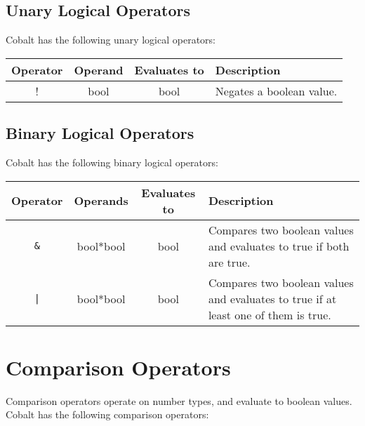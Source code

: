\documentclass[a4paper,appendixprefix]{scrreprt}
\begin{document}
\subsection{Unary Logical Operators}
Cobalt has the following unary logical operators:

\begin{center}
  \begin{tabularx}{\textwidth}{|c|c|c|X|}
    \hline
    \textbf{Operator} & \textbf{Operand} & \textbf{Evaluates to} & \textbf{Description} \\ \hline
    ! & bool & bool & Negates a boolean value. \\ \hline
  \end{tabularx}
\end{center}


\subsection{Binary Logical Operators}
Cobalt has the following binary logical operators:

\begin{center}
  \begin{tabularx}{\textwidth}{|c|c|c|X|}
    \hline
    \textbf{Operator} & \textbf{Operands} & \textbf{Evaluates to} & \textbf{Description} \\ \hline
    \verb|&| & bool*bool & bool & Compares two boolean values and evaluates to true if both are true. \\ \hline
    \texttt{|} & bool*bool & bool & Compares two boolean values and evaluates to true if at least one of them is true. \\ \hline
  \end{tabularx}
\end{center}

\pagebreak

\section{Comparison Operators}
Comparison operators operate on number types, and evaluate to boolean values. Cobalt has the following comparison operators:
\end{document}
